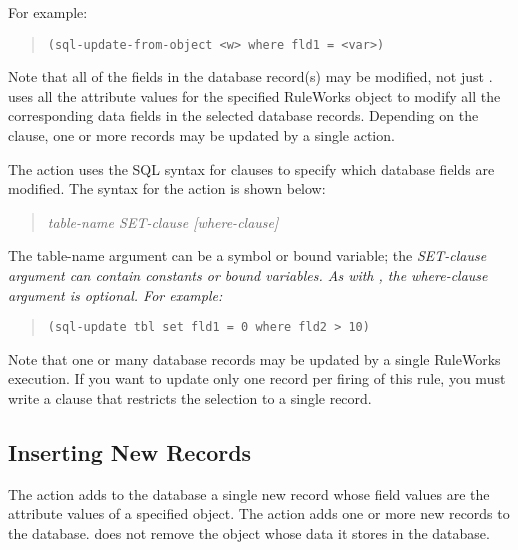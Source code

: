 For example:

\begin{quote}
\begin{verbatim}
(sql-update-from-object <w> where fld1 = <var>)
\end{verbatim}
\end{quote}

Note that all of the fields in the database record(s) may be modified,
not just .   uses all the
attribute values for the specified RuleWorks object to modify all the
corresponding data fields in the selected database records. Depending
on the  clause, one or more records may be updated by a
single  action.

The  action uses the SQL syntax for  clauses to
specify which database fields are modified. The syntax for the
 action is shown below:

\begin{quote}
   \it{table-name} \it{SET-clause} [\it{where-clause}]
\end{quote}

The table-name argument can be a symbol or bound variable; the
\it{SET-clause} argument can contain constants or bound variables. As with
, the \it{where-clause} argument is optional. For
example:

\begin{quote}
\begin{verbatim}
(sql-update tbl set fld1 = 0 where fld2 > 10)
\end{verbatim}
\end{quote}

Note that one or many database records may be updated by a single
RuleWorks  execution. If you want to update only one record
per firing of this rule, you must write a  clause that restricts
the selection to a single record.

\subsection{Inserting New Records}

The  action adds to the database a single
new record whose field values are the attribute values of a specified
object. The  action adds one or more new records to the
database.  does not remove the object whose
data it stores in the database.

